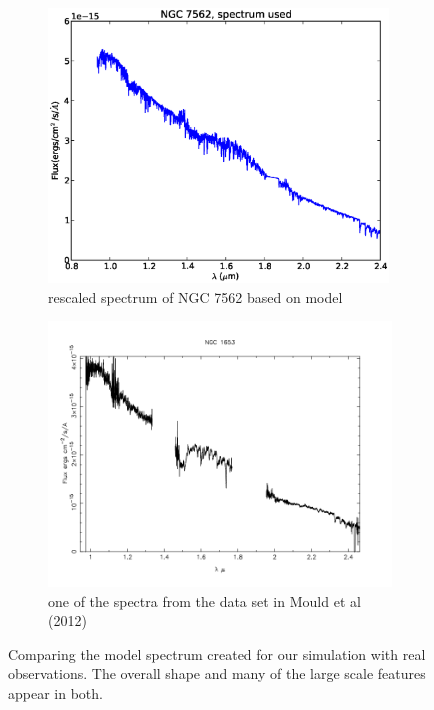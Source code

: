 \documentclass[11pt,twoside]{article}
\begin{document}
\begin{figure}[htbp]
\centering  
\begin{subfigure}{0.5\textwidth}
\includegraphics[width=0.99\textwidth]{flux_for_slit_comp}
\caption{rescaled spectrum of NGC 7562 based on model}
\end{subfigure}%
\begin{subfigure}{0.5\textwidth}
\includegraphics[width=1.1\textwidth]{spec_compare}
\caption{one of the spectra from the data set in Mould et al (2012)}
\end{subfigure}
\caption{Comparing the model spectrum created for our simulation with real observations. The overall shape and many of the large scale features appear in both.}
\label{compspec}
\end{figure}
\end{document}
